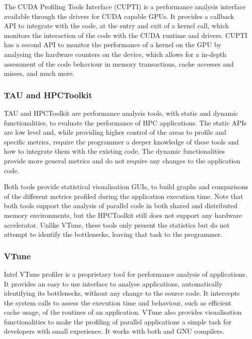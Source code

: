 The \nvidia CUDA Profiling Tools Interface (CUPTI) \cite{NVIDIA:CUPTI} is a performance analysis interface available through the \nvidia drivers for CUDA capable GPUs. It provides a callback API to integrate with the code, at the entry and exit of a kernel call, which monitors the interaction of the code with the CUDA runtime and drivers. CUPTI has a second API to monitor the performance of a kernel on the GPU by analysing the hardware counters on the device, which allows for a in-depth assessment of the code behaviour in memory transactions, cache accesses and misses, and much more.

\subsubsection*{TAU and HPCToolkit}

TAU \cite{TAU} and HPCToolkit \cite{HPCToolkit} are performance analysis tools, with static and dynamic functionalities, to evaluate the performance of HPC applications. The static APIs are low level and, while providing higher control of the areas to profile and specific metrics, require the programmer a deeper knowledge of these tools and how to integrate them with the existing code. The dynamic functionalities provide more general metrics and do not require any changes to the application code.

Both tools provide statistical visualisation GUIs, to build graphs and comparisons of the different metrics profiled during the application execution time. Note that both tools support the analysis of parallel code in both shared and distributed memory environments, but the HPCToolkit still does not support any hardware accelerator. Unlike VTune, these tools only present the statistics but do not attempt to identify the bottlenecks, leaving that task to the programmer.

\subsubsection*{VTune}

Intel VTune profiler \cite{Intel:VTune} is a proprietary tool for performance analysis of applications. It provides an easy to use interface to analyse applications, automatically identifying its bottlenecks, without any change to the source code. It intercepts the system calls to assess the execution time and behaviour, such as efficient cache usage, of the routines of an application. VTune also provides visualisation functionalities to make the profiling of parallel applications a simple task for developers with small experience. It works with both \intel and GNU compilers.

